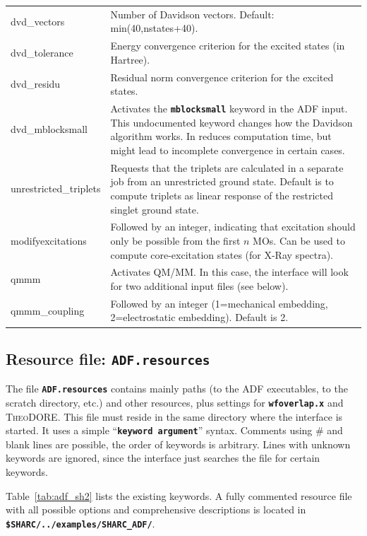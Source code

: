 \documentclass[a4paper,10pt,DIV=15,openany]{scrbook}
\newcommand{\ttt}[1]{\textbf{\texttt{#1}}}
\begin{document}
\begin{table}
\begin{tabular}{>{\ttfamily}lp{12cm}}
dvd\_vectors            &Number of Davidson vectors. Default: min(40,nstates+40).
\\
dvd\_tolerance          &Energy convergence criterion for the excited states (in Hartree).
\\
dvd\_residu             &Residual norm convergence criterion for the excited states. %
\\
dvd\_mblocksmall        &Activates the \ttt{mblocksmall} keyword in the ADF input. This undocumented keyword changes how the Davidson algorithm works. In reduces computation time, but might lead to incomplete convergence in certain cases.
\\
unrestricted\_triplets  &Requests that the triplets are calculated in a separate job from an unrestricted ground state. Default is to compute triplets as linear response of the restricted singlet ground state.
\\
modifyexcitations       &Followed by an integer, indicating that excitation should only be possible from the first $n$ MOs. Can be used to compute core-excitation states (for X-Ray spectra).
\\
qmmm                    &Activates QM/MM. In this case, the interface will look for two additional input files (see below).
\\
qmmm\_coupling          &Followed by an integer (1=mechanical embedding, 2=electrostatic embedding). Default is 2.
\\
  \hline
  \end{tabular}
\end{table}

\subsection{Resource file: \ttt{ADF.resources}}

The file \ttt{ADF.resources} contains mainly paths (to the \textsc{ADF} executables, to the scratch directory, etc.) and other resources, plus settings for \ttt{wfoverlap.x} and \textsc{TheoDORE}. This file must reside in the same directory where the interface is started. It uses a simple ``\ttt{keyword argument}'' syntax. Comments using \# and blank lines are possible, the order of keywords is arbitrary. Lines with unknown keywords are ignored, since the interface just searches the file for certain keywords.

Table~\ref{tab:adf_sh2} lists the existing keywords.
A fully commented resource file with all possible options and comprehensive descriptions is located in \ttt{\$SHARC/../examples/SHARC\_ADF/}.
\end{document}
